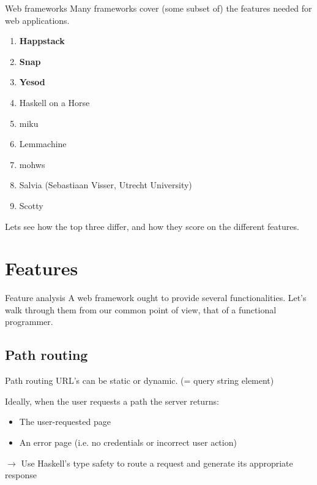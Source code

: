 \documentclass[10pt,usenames,dvipsnames]{beamer}
\begin{document}
	\begin{frame}{Web frameworks}
		Many frameworks cover (some subset of) the features needed for web applications.
		
		\begin{enumerate}
			\item \textbf{Happstack}
			\item \textbf{Snap}
			\item \textbf{Yesod}
			\item Haskell on a Horse
			\item miku
			\item Lemmachine
			\item mohws
			\item Salvia (Sebastiaan Visser, Utrecht University)
			\item Scotty 
		\end{enumerate}
		
		Lets see how the top three differ, and how they score on the different features.
	\end{frame}
	
	
	\section{Features}
	
	\begin{frame}{Feature analysis}
		A web framework ought to provide several functionalities.
		Let's walk through them from our common point of view, that of a functional programmer.
	\end{frame}
	
	\subsection*{Path routing}
	\begin{frame}{Path routing}
		URL's can be static or dynamic. (= query string element)
		
		Ideally, when the user requests a path the server returns:
		\begin{itemize}
			\item The user-requested page
			\item An error page (i.e. no credentials or incorrect user action)
		\end{itemize} 
		
		$ \rightarrow $ Use Haskell's type safety to route a request and generate its appropriate response
	\end{frame}
	
\end{document}
